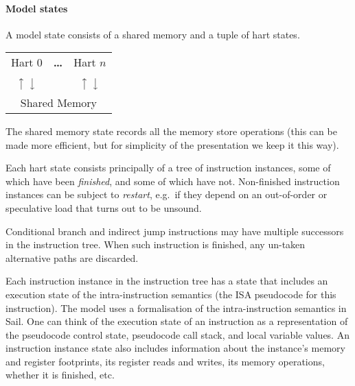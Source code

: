 \paragraph{Model states}
A model state consists of a shared memory and a tuple of hart states.
\begin{center}
\sffamily
\begin{tabular}{ccc}
\cline{1-1}\cline{3-3}
\multicolumn{1}{|c|}{Hart 0} & \bf \dots & \multicolumn{1}{|c|}{Hart $n$} \\
\cline{1-1}\cline{3-3}
$\big\uparrow$ $\big\downarrow$ & & $\big\uparrow$ $\big\downarrow$ \\
\hline
\multicolumn{3}{|c|}{Shared Memory} \\
\hline
\end{tabular}
\end{center}
The shared memory state records all the memory store operations (this can be made more efficient, but for simplicity of the presentation we keep it this way).

Each hart state consists principally of a tree of instruction instances, some of which have been \emph{finished}, and some of which have not.
Non-finished instruction instances can be subject to \emph{restart}, e.g.~if they depend on an out-of-order or speculative load that turns out to be unsound.

Conditional branch and indirect jump instructions may have multiple successors in the instruction tree.
When such instruction is finished, any un-taken alternative paths are discarded.

Each instruction instance in the instruction tree has a state that
includes an execution state of the intra-instruction semantics (the
ISA pseudocode for this instruction).
The model uses a formalisation of the intra-instruction semantics in Sail.
One can think of the execution state of an instruction as a representation of the pseudocode control state, pseudocode call stack, and local variable values.
An instruction instance state also includes information about the instance's memory and register footprints, its register reads and writes, its memory operations, whether it is finished, etc.

